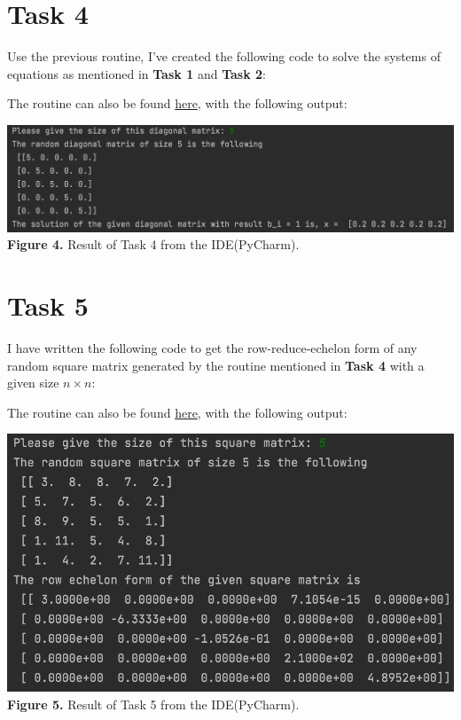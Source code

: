 \documentclass{article}
\begin{document}
\section*{Task 4}
Use the previous routine, I've created the following code to solve the systems of equations as mentioned in {\bf Task 1} and {\bf Task 2}:

The routine can also be found \href{https://github.com/GoByMark/math4610/blob/main/Homework_Tasks/Tasksheet_07/src/Task_4.py}{here}, with the following output:
\begin{center}
\includegraphics[width=\textwidth]{Screenshots/4.png}
{\bf Figure 4.} Result of Task 4 from the IDE(PyCharm).
\end{center}

\section*{Task 5}
I have written the following code to get the row-reduce-echelon form of any random square matrix generated by the routine mentioned in {\bf Task 4} with a given size $n \times n$:

The routine can also be found \href{https://github.com/GoByMark/math4610/blob/main/Homework_Tasks/Tasksheet_07/src/Task_5.py}{here}, with the following output:
\begin{center}
\includegraphics[width=\textwidth]{Screenshots/5.png}
{\bf Figure 5.} Result of Task 5 from the IDE(PyCharm).
\end{center}
\end{document}

